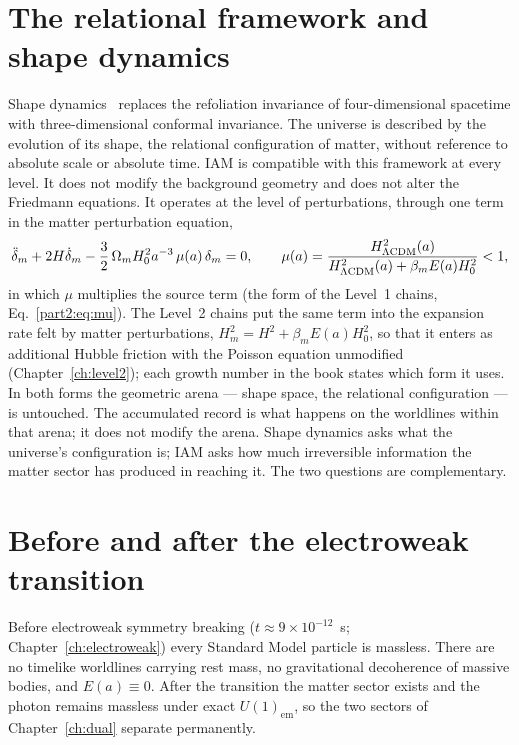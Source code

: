 \section{The relational framework and shape dynamics}\label{sec:time_shape}
Shape dynamics~\cite{Barbour2012,BarbourKoslowskiMercati2014} replaces the refoliation invariance of four-dimensional spacetime with three-dimensional
conformal invariance. The universe is described by the evolution of its shape, the relational configuration of matter, without reference to absolute
scale or absolute time. IAM is compatible with this framework at every level. It does not modify the background geometry and does not alter the
Friedmann equations. It operates at the level of perturbations, through one term in the matter perturbation equation,
\begin{equation}
\ddot\delta_m+2H\dot\delta_m-\frac32\,\Omega_mH_0^2a^{-3}\,\mu(a)\,\delta_m=0,\qquad
\mu(a)=\frac{H^2_{\Lambda\rm CDM}(a)}{H^2_{\Lambda\rm CDM}(a)+\beta_mE(a)H_0^2}<1,\label{eq:time_growth}
\end{equation}
in which $\mu$ multiplies the source term (the form of the Level~1 chains, Eq.~\ref{part2:eq:mu}). \derived{} The Level~2 chains put the same term into
the expansion rate felt by matter perturbations, $H_m^2=H^2+\beta_mE(a)H_0^2$, so that it enters as additional Hubble friction with the Poisson equation
unmodified (Chapter~\ref{ch:level2}); each growth number in the book states which form it uses. In both forms the geometric arena --- shape space, the
relational configuration --- is untouched. The accumulated record is what happens on the worldlines within that arena; it does not modify the arena.
Shape dynamics asks what the universe's configuration is; IAM asks how much irreversible information the matter sector has produced in reaching it. The
two questions are complementary. \interp

\section{Before and after the electroweak transition}\label{sec:time_ew}
Before electroweak symmetry breaking ($t\approx9\times10^{-12}$~s; Chapter~\ref{ch:electroweak}) every Standard Model particle is
massless. There are no timelike worldlines carrying rest mass, no gravitational decoherence
of massive bodies, and $E(a)\equiv0$. After the transition the matter sector exists and the
photon remains massless under exact $U(1)_{\mathrm{em}}$, so the two sectors of
Chapter~\ref{ch:dual} separate permanently. \interp


